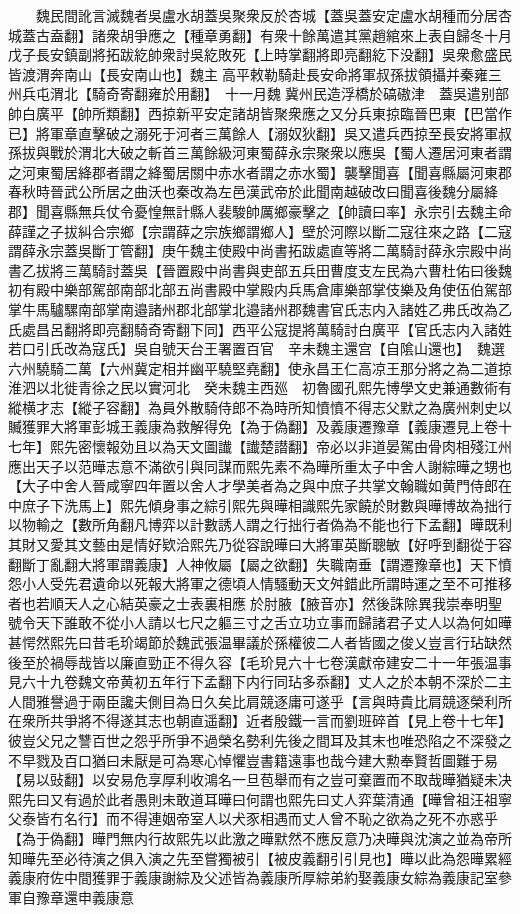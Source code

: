 　　魏民間訛言滅魏者吳盧水胡蓋吳聚衆反於杏城【蓋吳蓋安定盧水胡種而分居杏城蓋古盍翻】諸衆胡爭應之【種章勇翻】有衆十餘萬遣其黨趙綰來上表自歸冬十月戊子長安鎮副將拓跋紇帥衆討吳紇敗死【上時掌翻將即亮翻紇下没翻】吳衆愈盛民皆渡渭奔南山【長安南山也】魏主高平敕勒騎赴長安命將軍叔孫拔領攝并秦雍三州兵屯渭北【騎奇寄翻雍於用翻】　十一月魏冀州民造浮橋於碻磝津　蓋吳遣别部帥白廣平【帥所類翻】西掠新平安定諸胡皆聚衆應之又分兵東掠臨晉巴東【巴當作已】將軍章直擊破之溺死于河者三萬餘人【溺奴狄翻】吳又遣兵西掠至長安將軍叔孫拔與戰於渭北大破之斬首三萬餘級河東蜀薛永宗聚衆以應吳【蜀人遷居河東者謂之河東蜀居絳郡者謂之絳蜀居關中赤水者謂之赤水蜀】襲擊聞喜【聞喜縣屬河東郡春秋時晉武公所居之曲沃也秦改為左邑漢武帝於此聞南越破改曰聞喜後魏分屬絳郡】聞喜縣無兵仗令憂惶無計縣人裴駿帥厲鄉豪擊之【帥讀曰率】永宗引去魏主命薛謹之子拔糾合宗鄉【宗謂薛之宗族鄉謂鄉人】壁於河際以斷二寇往來之路【二寇謂薛永宗蓋吳斷丁管翻】庚午魏主使殿中尚書拓跋處直等將二萬騎討薛永宗殿中尚書乙拔將三萬騎討蓋吳【晉置殿中尚書與吏部五兵田曹度支左民為六曹杜佑曰後魏初有殿中樂部駕部南部北部五尚書殿中掌殿内兵馬倉庫樂部掌伎樂及角使伍伯駕部掌牛馬驢騾南部掌南邉諸州郡北部掌北邉諸州郡魏書官氏志内入諸姓乙弗氏改為乙氏處昌呂翻將即亮翻騎奇寄翻下同】西平公寇提將萬騎討白廣平【官氏志内入諸姓若口引氏改為寇氏】吳自號天台王署置百官　辛未魏主還宫【自隂山還也】　魏選六州驍騎二萬【六州冀定相并幽平驍堅堯翻】使永昌王仁高凉王那分將之為二道掠淮泗以北徙青徐之民以實河北　癸未魏主西廵　初魯國孔熙先博學文史兼通數術有縱横才志【縱子容翻】為員外散騎侍郎不為時所知憤憤不得志父默之為廣州刺史以贓獲罪大將軍彭城王義康為救解得免【為于偽翻】及義康遷豫章【義康遷見上卷十七年】熙先密懷報効且以為天文圖䜟【䜟楚譛翻】帝必以非道晏駕由骨肉相殘江州應出天子以范曄志意不滿欲引與同謀而熙先素不為曄所重太子中舍人謝綜曄之甥也【大子中舍人晉咸寧四年置以舍人才學美者為之與中庶子共掌文翰職如黄門侍郎在中庶子下洗馬上】熙先傾身事之綜引熙先與曄相識熙先家饒於財數與曄博故為拙行以物輸之【數所角翻凡博弈以計數誘人謂之行拙行者偽為不能也行下孟翻】曄既利其財又愛其文藝由是情好欵洽熙先乃從容說曄曰大將軍英斷聰敏【好呼到翻從于容翻斷丁亂翻大將軍謂義康】人神攸屬【屬之欲翻】失職南垂【謂遷豫章也】天下憤怨小人受先君遺命以死報大將軍之德頃人情騷動天文舛錯此所謂時運之至不可推移者也若順天人之心結英豪之士表裏相應於肘腋【腋音亦】然後誅除異我崇奉明聖號令天下誰敢不從小人請以七尺之軀三寸之舌立功立事而歸諸君子丈人以為何如曄甚愕然熙先曰昔毛玠竭節於魏武張温畢議於孫權彼二人者皆國之俊乂豈言行玷缺然後至於禍辱哉皆以廉直勁正不得久容【毛玠見六十七卷漢獻帝建安二十一年張温事見六十九卷魏文帝黄初五年行下孟翻下内行同玷多忝翻】丈人之於本朝不深於二主人間雅譽過于兩臣讒夫側目為日久矣比肩競逐庸可遂乎【言與時貴比肩競逐榮利所在衆所共爭將不得遂其志也朝直遥翻】近者殷鐵一言而劉班碎首【見上卷十七年】彼豈父兄之讐百世之怨乎所爭不過榮名勢利先後之間耳及其末也唯恐陷之不深發之不早戮及百口猶曰未厭是可為寒心悼懼豈書籍遠事也哉今建大勲奉賢哲圖難于易【易以䜴翻】以安易危享厚利收鴻名一旦苞舉而有之豈可棄置而不取哉曄猶疑未决熙先曰又有過於此者愚則未敢道耳曄曰何謂也熙先曰丈人弈葉清通【曄曾祖汪祖寧父泰皆冇名行】而不得連姻帝室人以犬豕相遇而丈人曾不恥之欲為之死不亦惑乎【為于偽翻】曄門無内行故熙先以此激之曄默然不應反意乃决曄與沈演之並為帝所知曄先至必待演之俱入演之先至嘗獨被引【被皮義翻引引見也】曄以此為怨曄累經義康府佐中間獲罪于義康謝綜及父述皆為義康所厚綜弟約娶義康女綜為義康記室參軍自豫章還申義康意